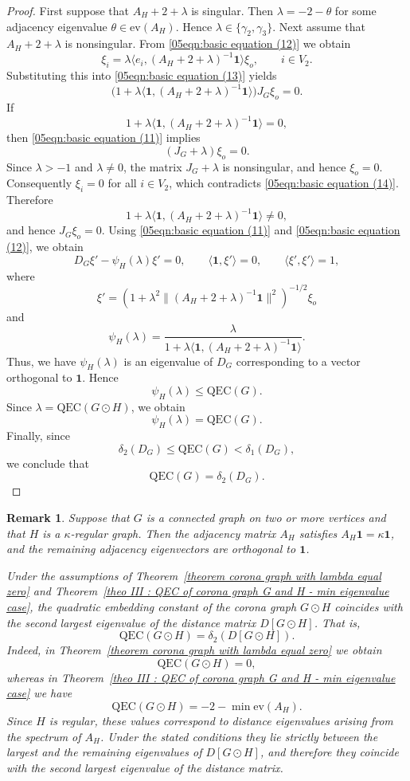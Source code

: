 \documentclass[pdflatex,sn-mathphys-num]{sn-jnl}
\theoremstyle{thmstyleone}%
\theoremstyle{thmstyletwo}%
\newtheorem{remark}{Remark}%
\theoremstyle{thmstylethree}%
\begin{document}
\begin{proof}
First suppose that $A_H+2+\lambda$ is singular.
Then $\lambda=-2-\theta$ for some adjacency eigenvalue
$\theta\in \mathrm{ev}(A_H)$.
Hence $\lambda\in\{\gamma_2,\gamma_3\}$. Next assume that $A_H+2+\lambda$ is nonsingular.
From \eqref{05eqn:basic equation (12)} we obtain
\[
\xi_i
=\lambda
\langle e_i,(A_H+2+\lambda)^{-1}\mathbf1\rangle
\xi_o,
\qquad i\in V_2.
\]
Substituting this into \eqref{05eqn:basic equation (13)} yields
\[
\bigl(
1+\lambda\langle \mathbf1,(A_H+2+\lambda)^{-1}\mathbf1\rangle
\bigr)
J_G\xi_o=0.
\]
If
\[
1+\lambda\langle \mathbf1,(A_H+2+\lambda)^{-1}\mathbf1\rangle=0,
\]
then \eqref{05eqn:basic equation (11)} implies
\[
(J_G+\lambda)\xi_o=0.
\]
Since $\lambda>-1$ and $\lambda\ne 0$, the matrix $J_G+\lambda$ is nonsingular,
and hence $\xi_o=0$.
Consequently $\xi_i=0$ for all $i\in V_2$, which contradicts
\eqref{05eqn:basic equation (14)}.
Therefore
\[
1+\lambda\langle \mathbf1,(A_H+2+\lambda)^{-1}\mathbf1\rangle\neq0,
\]
and hence $J_G\xi_o=0$.
Using \eqref{05eqn:basic equation (11)} and \eqref{05eqn:basic equation (12)},
we obtain
\[
D_G\xi'-\psi_H(\lambda)\xi'=0,
\qquad
\langle \mathbf1,\xi'\rangle=0,
\qquad
\langle \xi',\xi'\rangle=1,
\]
where
\[
\xi'
=
\left(
1+\lambda^2
\|(A_H+2+\lambda)^{-1}\mathbf1\|^2
\right)^{-1/2}
\xi_o
\]
and
\[
\psi_H(\lambda)
=
\frac{\lambda}{
1+\lambda\langle \mathbf1,(A_H+2+\lambda)^{-1}\mathbf1\rangle}.
\]
Thus, we have $\psi_H(\lambda)$ is an eigenvalue of $D_G$ corresponding to a vector orthogonal to
$\mathbf1$.
Hence
\[
\psi_H(\lambda)\le \mathrm{QEC}(G).
\]
Since $\lambda=\mathrm{QEC}(G\odot H)$, we obtain
\[
\psi_H(\lambda)=\mathrm{QEC}(G).
\]
Finally, since
\[
\delta_2(D_G)\le \mathrm{QEC}(G)<\delta_1(D_G),
\]
we conclude that
\[
\mathrm{QEC}(G)=\delta_2(D_G).
\]
\end{proof}

\begin{remark}
Suppose that $G$ is a connected graph on two or more vertices and that
$H$ is a $\kappa$-regular graph. Then the adjacency matrix $A_H$
satisfies $A_H\mathbf{1}=\kappa\mathbf{1}$, and the remaining
adjacency eigenvectors are orthogonal to $\mathbf{1}$. 

Under the assumptions of Theorem~\ref{theorem corona graph with lambda equal zero}
and Theorem~\ref{theo III : QEC of corona graph G and H - min eigenvalue case},
the quadratic embedding constant of the corona graph $G\odot H$
coincides with the second largest eigenvalue of the distance matrix
$D[G\odot H]$. That is,
\[
\mathrm{QEC}(G\odot H)=\delta_2(D[G\odot H]).
\]
Indeed, in Theorem~\ref{theorem corona graph with lambda equal zero}
we obtain \[\mathrm{QEC}(G\odot H)=0,\] whereas in
Theorem~\ref{theo III : QEC of corona graph G and H - min eigenvalue case}
we have
\[
\mathrm{QEC}(G\odot H)=-2-\min \mathrm{ev}(A_H).
\]
Since $H$ is regular, these values correspond to distance eigenvalues
arising from the spectrum of $A_H$. Under the stated conditions they
lie strictly between the largest and the remaining eigenvalues of
$D[G\odot H]$, and therefore they coincide with the second largest
eigenvalue of the distance matrix.
\end{remark}
\end{document}
